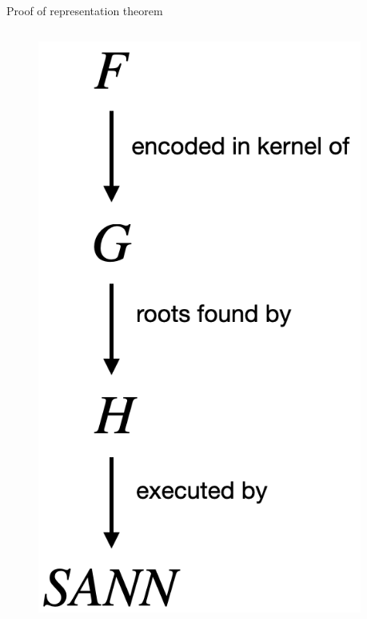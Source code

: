 \documentclass[final]{beamer}
\newlength{\lrcolwidth}
\begin{document}
\begin{frame}[t]
\begin{columns}[t]
\begin{column}{\lrcolwidth}
  \begin{block}{Proof of representation theorem}

    \begin{columns}
      \begin{column}{0.29\textwidth}
        \vspace{2cm}
        \begin{figure}[t]
          \centering
          \includegraphics[width=\textwidth]{images/overview.png}       
        \end{figure}
      \end{column}
      \begin{column}{0.7\textwidth}


\end{column}
\end{columns}
\end{block}
\end{column}
\end{columns}
\end{frame}
\end{document}
